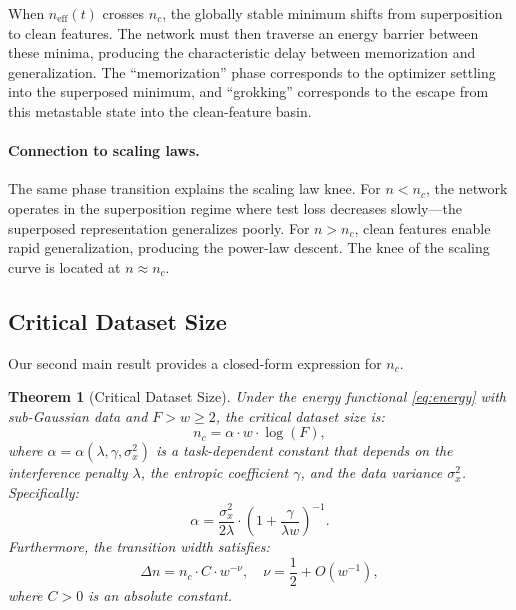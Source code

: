 \documentclass{article}
\newtheorem{theorem}{Theorem}
\newcommand{\nc}{n_c}
\newcommand{\Fnum}{F}
\begin{document}
When $n_{\text{eff}}(t)$ crosses $\nc$, the globally stable minimum shifts from superposition to clean features.
The network must then traverse an energy barrier between these minima, producing the characteristic delay between memorization and generalization.
The ``memorization'' phase corresponds to the optimizer settling into the superposed minimum, and ``grokking'' corresponds to the escape from this metastable state into the clean-feature basin.

\paragraph{Connection to scaling laws.}
The same phase transition explains the scaling law knee.
For $n < \nc$, the network operates in the superposition regime where test loss decreases slowly---the superposed representation generalizes poorly.
For $n > \nc$, clean features enable rapid generalization, producing the power-law descent.
The knee of the scaling curve is located at $n \approx \nc$.

\subsection{Critical Dataset Size}
\label{sec:critical_size}

Our second main result provides a closed-form expression for $\nc$.

\begin{theorem}[Critical Dataset Size]
\label{thm:critical_size}
Under the energy functional \eqref{eq:energy} with sub-Gaussian data and $\Fnum > w \geq 2$, the critical dataset size is:
\begin{equation}
\label{eq:nc}
\nc = \alpha \cdot w \cdot \log(\Fnum),
\end{equation}
where $\alpha = \alpha(\lambda, \gamma, \sigma_x^2)$ is a task-dependent constant that depends on the interference penalty $\lambda$, the entropic coefficient $\gamma$, and the data variance $\sigma_x^2$.
Specifically:
\begin{equation}
\label{eq:alpha}
\alpha = \frac{\sigma_x^2}{2\lambda} \cdot \left(1 + \frac{\gamma}{\lambda w}\right)^{-1}.
\end{equation}
Furthermore, the transition width satisfies:
\begin{equation}
\label{eq:transition_width}
\Delta n = \nc \cdot C \cdot w^{-\nu}, \quad \nu = \frac{1}{2} + O(w^{-1}),
\end{equation}
where $C > 0$ is an absolute constant.
\end{theorem}
\end{document}
